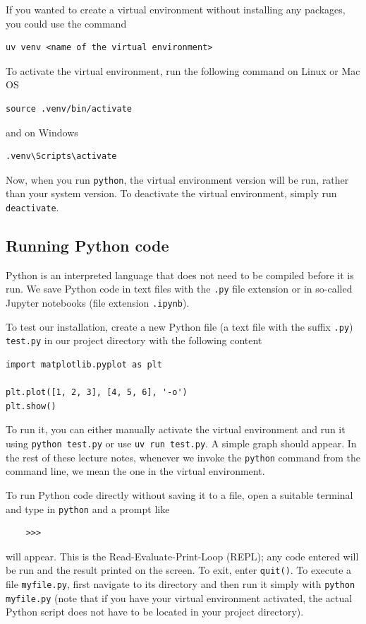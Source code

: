 If you wanted to create a virtual environment without installing any packages, you could use the command
\begin{lstlisting}
uv venv <name of the virtual environment>
\end{lstlisting}

To activate the virtual environment, run the following command on Linux or Mac OS
\begin{lstlisting}
source .venv/bin/activate
\end{lstlisting}
and on Windows
\begin{lstlisting}
.venv\Scripts\activate
\end{lstlisting}

Now, when you run \verb|python|, the virtual environment version will be run, rather than your system version. To deactivate the virtual environment, simply run \verb|deactivate|.

\subsection{Running Python code}
Python is an interpreted language that does not need to be compiled before it is run. We save Python code in text files with the \verb|.py| file extension or in so-called Jupyter notebooks (file extension \verb|.ipynb|).

To test our installation, create a new Python file (a text file with the suffix \verb|.py|) \verb|test.py| in our project directory with the following content
\begin{lstlisting}
import matplotlib.pyplot as plt

plt.plot([1, 2, 3], [4, 5, 6], '-o')
plt.show()
\end{lstlisting}
To run it, you can either manually activate the virtual environment and run it using \verb|python test.py| or use \verb|uv run test.py|. A simple graph should appear. In the rest of these lecture notes, whenever we invoke the \verb|python| command from the command line, we mean the one in the virtual environment.

To run Python code directly without saving it to a file, open a suitable terminal and type in \verb|python| and a prompt like
\begin{lstlisting}
    >>>
\end{lstlisting}
will appear. This is the Read-Evaluate-Print-Loop (REPL); any code entered will be run and the result printed on the screen. To exit, enter \verb|quit()|. To execute a file \verb|myfile.py|, first navigate to its directory and then run it simply with \verb|python myfile.py| (note that if you have your virtual environment activated, the actual Python script does not have to be located in your project directory).

